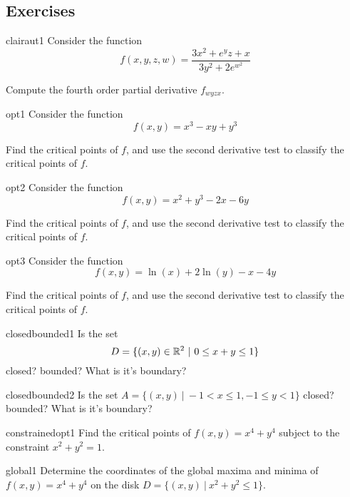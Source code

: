 \subsection{Exercises}


\begin{problem}{clairaut1}
    Consider the function $$f(x,y,z,w) = \frac{3x^2 + e^yz + x}{3y^2+2e^{w^2}}$$ 

Compute the fourth order partial derivative $f_{wyzx}$.
\end{problem}

\begin{problem}{opt1}
    Consider the function $$f(x,y) = x^3 - xy +  y^3 $$
    
    Find the critical points of $f$, and use the second derivative test to classify the critical points of $f$.
\end{problem}

\begin{problem}{opt2}
    Consider the function $$f(x,y) = x^2 + y^3 - 2x - 6y$$
    
    Find the critical points of $f$, and use the second derivative test to classify the critical points of $f$.
\end{problem}

\begin{problem}{opt3}
    Consider the function $$f(x,y) = \ln(x) + 2\ln(y) -x - 4y$$
    
    Find the critical points of $f$, and use the second derivative test to classify the critical points of $f$.
\end{problem}

\begin{problem}{closedbounded1}
    Is the set $$D = \{(x,y) \in \mathbb{R}^2 \ | \ 0 \leq x + y \leq 1 \}$$ closed? bounded? What is it's boundary?
\end{problem}

\begin{problem}{closedbounded2}
    Is the set $A = \{(x,y) \ | \ -1 < x \leq 1, -1 \leq y < 1\}$ closed? bounded? What is it's boundary?
\end{problem}


\begin{problem}{constrainedopt1}
    Find the critical points of $f(x,y) = x^4 + y^4$ subject to the constraint $x^2+y^2=1$.  
\end{problem}

\begin{problem}{global1}
    Determine the coordinates of the global maxima and minima of $f(x,y) = x^4 + y^4$ on the disk $D = \{ (x,y) \ | \ x^2 + y^2 \leq 1\}$.
\end{problem}

